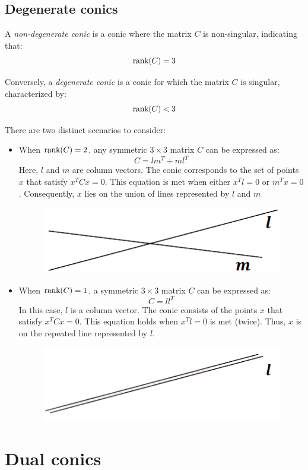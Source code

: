 \documentclass[12pt, a4paper]{report}
\begin{document}
    \subsection{Degenerate conics}
    \begin{definition}
        A \emph{non-degenerate conic} is a conic where the matrix $C$ is non-singular, indicating that: 
        \[\textnormal{rank}(C)=3\]

        Conversely, a \emph{degenerate conic} is a conic  for which the matrix $C$ is singular, characterized by: 
        \[\textnormal{rank}(C) < 3\]
    \end{definition}
    There are two distinct scenarios to consider:
    \begin{itemize}
        \item When $\textnormal{rank}(C) = 2$, any symmetric $3 \times 3$ matrix $C$ can be expressed as:
            \[C=lm^T+ml^T\]
            Here, $l$ and $m$ are column vectors. 
            The conic corresponds to the set of points $x$  that satisfy $x^TCx=0$.
            This equation is met when either $x^Tl=0$ or $m^Tx=0$. 
            Consequently, $x$ lies on the union of lines represented by $l$ and $m$
            \begin{figure}[H]
                \centering
                \includegraphics[width=0.25\linewidth]{images/inters.png}
            \end{figure}
        \item When $\textnormal{rank}(C) = 1$, a symmetric $3 \times 3$ matrix $C$ can be expressed as:
            \[C=ll^T\]
            In this case, $l$ is a column vector. 
            The conic consists of the points $x$ that satisfy $x^TCx=0$.
            This equation holds  when $x^Tl=0$ is met (twice). 
            Thus, $x$ is on the repeated line represented by $l$.
            \begin{figure}[H]
                \centering
                \includegraphics[width=0.25\linewidth]{images/rep.png}
            \end{figure}
    \end{itemize}

    \section{Dual conics}
\end{document}

